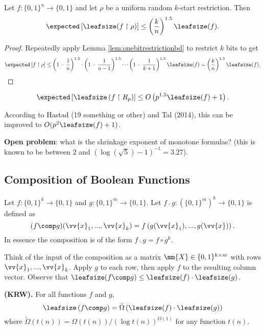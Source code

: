 \begin{theorem}
	\label{thm:subbotovskaya-restrictionlb}
	Let $f: \{0,1\}^n \rightarrow \{0,1\}$ and let $\rho$ be a uniform random $k$-start restriction. Then 
	\[\expected\left[\leafsize(f\upharpoonright \rho)\right] \leq \left(\frac{k}{n}\right)^{1.5}\leafsize(f).\]
\end{theorem}
\begin{proof}
	Repeatedly apply Lemma \ref{lem:onebitrestrictionbd} to restrict $k$ bits to get
	\[\expected\left[f \upharpoonright \rho\right] \leq \left(1 - \frac{1}{n}\right)^{1.5}\cdot\left(1 - \frac{1}{n-1}\right)^{1.5}\cdots\left(1 - \frac{1}{k+1}\right)^{1.5} \leafsize(f) = \left(\frac{k}{n}\right)^{1.5}\leafsize(f).\]
\end{proof}

\begin{corollary}
	\label{cor:extsubbotovskayatorandrestrictions}
	\[\expected\left[\leafsize\left(f\upharpoonright R_p\right)\right] \leq O\left(p^{1.5}\leafsize(f) + 1\right).\]
\end{corollary}
According to Hastad (19 something or other) and Tal (2014), this can be improved to $O(p^2\leafsize(f) + 1)$.

\textbf{Open problem}: what is the shrinkage exponent of monotone formulas? (this is known to be between $2$ and $\left(\log (\sqrt{5}) - 1\right)^{-1} = 3.27$).

\subsection{Composition of Boolean Functions}
\begin{definition}
	Let $f:\{0,1\}^k \rightarrow \{0,1\}$ and $g: \{0,1\}^m \rightarrow \{0,1\}$. Let $f \comp g: (\{0,1\}^m)^k \rightarrow \{0,1\}$ is defined as
	\[(f \comp g)(\vv{x}_1, ..., \vv{x}_k) = f\left(g(\vv{x}_1), ..., g(\vv{x})\right).\]
	In essence the composition is of the form $f \comp g = f \circ g^k$. 
\end{definition}
Think of the input of the composition as a matrix $\mm{X} \in \{0,1\}^{k \times m}$ with rows $\vv{x}_1, ..., \vv{x}_k$. Apply $g$ to each row, then apply $f$ to the resulting column vector. Observe that $\leafsize(f \comp g) \leq \leafsize(f) \cdot \leafsize(g)$. 

\begin{conjecture}
	\textbf{(KRW).} For all functions $f$ and $g$,
	\[\leafsize\left(f \comp g\right) = \tilde{\Omega}\left(\leafsize(f)\cdot \leafsize(g)\right)\]
	where $\tilde{\Omega}(t(n)) = \Omega(t(n))/\left(\log t(n)\right)^{O(1)}$ for any function $t(n)$.
\end{conjecture}

